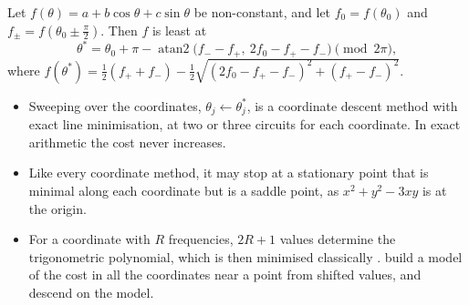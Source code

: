 \documentclass[handoutsbeamer.tex]{subfiles}
\begin{document}
\begin{frame}
\onp{\footnotesize}
\begin{propn}\label{propn:ch07:roto}
Let $f(\theta) = a + b\cos\theta + c\sin\theta$ be non-constant, and let $f_0 = f(\theta_0)$ and $f_\pm = f(\theta_0\pm\frac\pi2)$. Then $f$ is least at
\begin{equation}\label{eq:ch07:roto}
    \theta^* = \theta_0 + \pi - \operatorname{atan2}\big(f_--f_+,\ 2f_0-f_+-f_-\big)\pmod{2\pi},
\end{equation}
where $f(\theta^*) = \frac12(f_++f_-) - \frac12\sqrt{(2f_0-f_+-f_-)^2+(f_+-f_-)^2}$.
\end{propn}
\begin{itemize}\setlength\itemsep{0.2em}
    \item Sweeping over the coordinates, $\theta_j\leftarrow\theta_j^*$, is a coordinate descent method with exact line minimisation, at two or three circuits for each coordinate. In exact arithmetic the cost never increases.
    \item Like every coordinate method, it may stop at a stationary point that is minimal along each coordinate but is a saddle point, as $x^2+y^2-3xy$ is at the origin.
    \item For a coordinate with $R$ frequencies, $2R+1$ values determine the trigonometric polynomial, which is then minimised classically \citep{Wierichs2021}. \citet{koczor2022quantum} build a model of the cost in all the coordinates near a point from shifted values, and descend on the model.
\end{itemize}
\end{frame}
\end{document}
